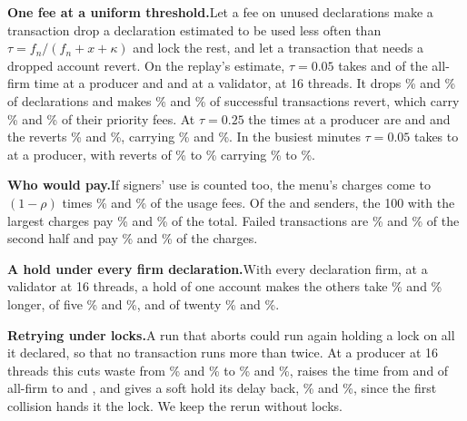 \documentclass[conference,compsoc]{IEEEtran}
\numberwithin{equation}{section}
\theoremstyle{plain}
\theoremstyle{definition}
\theoremstyle{remark}
\newcommand{\runin}[1]{\par\smallskip\noindent\textbf{#1.}\enspace}
\begin{document}
\runin{One fee at a uniform threshold}Let a fee on unused declarations make a transaction drop a declaration estimated to be used less often than $\tau = f_n/(f_n + x + \kappa)$ and lock the rest, and let a transaction that needs a dropped account revert. On the replay's estimate, $\tau = 0.05$ takes \freeOneFeeRatioLowSixteenA{} and \freeOneFeeRatioLowSixteenB{} of the all-firm time at a producer and \oneFeeRatioLowSixteenA{} and \oneFeeRatioLowSixteenB{} at a validator, at 16 threads. It drops \oneFeeDroppedLowA\% and \oneFeeDroppedLowB\% of declarations and makes \oneFeeRevertedLowA\% and \oneFeeRevertedLowB\% of successful transactions revert, which carry \oneFeeRevertedFeeLowA\% and \oneFeeRevertedFeeLowB\% of their priority fees. At $\tau = 0.25$ the times at a producer are \freeOneFeeRatioMidSixteenA{} and \freeOneFeeRatioMidSixteenB{} and the reverts \oneFeeRevertedMidA\% and \oneFeeRevertedMidB\%, carrying \oneFeeRevertedFeeMidA\% and \oneFeeRevertedFeeMidB\%. In the busiest minutes $\tau = 0.05$ takes \winOneFeeFreeMin{} to \winOneFeeFreeMax{} at a producer, with reverts of \winOneFeeRevertedMin\% to \winOneFeeRevertedMax\% carrying \winOneFeeRevertedFeeMin\% to \winOneFeeRevertedFeeMax\%.

\runin{Who would pay}If signers' use is counted too, the menu's charges come to $(1-\rho)$ times \incOverUsageSignersA\% and \incOverUsageSignersB\% of the usage fees. Of the \incSendersA{} and \incSendersB{} senders, the 100 with the largest charges pay \incTopHundredA\% and \incTopHundredB\% of the total. Failed transactions are \incFailedTxA\% and \incFailedTxB\% of the second half and pay \incFailedChargeA\% and \incFailedChargeB\% of the charges.

\runin{A hold under every firm declaration}With every declaration firm, at a validator at 16 threads, a hold of one account makes the others take \occFirmOneA\% and \occFirmOneB\% longer, of five \occFirmFiveA\% and \occFirmFiveB\%, and of twenty \occFirmTwentyA\% and \occFirmTwentyB\%.

\runin{Retrying under locks}A run that aborts could run again holding a lock on all it declared, so that no transaction runs more than twice. At a producer at 16 threads this cuts waste from \freeMenuLoWasteSixteenA\% and \freeMenuLoWasteSixteenB\% to \retryWasteA\% and \retryWasteB\%, raises the time from \freeMenuLoRatioSixteenA{} and \freeMenuLoRatioSixteenB{} of all-firm to \retryRatioA{} and \retryRatioB{}, and gives a soft hold its delay back, \retryHoldA\% and \retryHoldB\%, since the first collision hands it the lock. We keep the rerun without locks.
\end{document}
